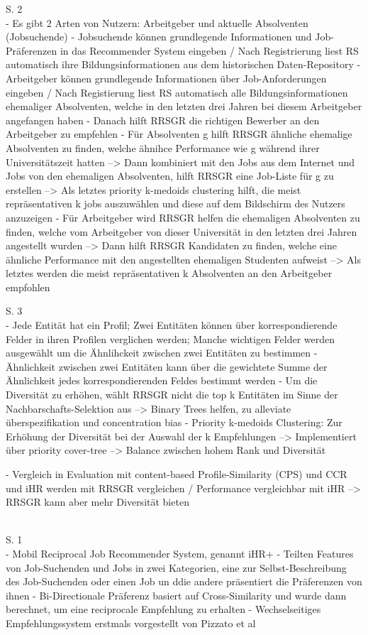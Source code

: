 S. 2\\
- Es gibt 2 Arten von Nutzern: Arbeitgeber und aktuelle Absolventen (Jobsuchende)
- Jobsuchende können grundlegende Informationen und Job-Präferenzen in das Recommender System eingeben / Nach Registrierung liest RS automatisch ihre Bildungsinformationen aus dem historischen Daten-Repository
- Arbeitgeber können grundlegende Informationen über Job-Anforderungen eingeben / Nach Registierung liest RS automatisch alle Bildungsinformationen ehemaliger Absolventen, welche in den letzten drei Jahren bei diesem Arbeitgeber angefangen haben
- Danach hilft RRSGR die richtigen Bewerber an den Arbeitgeber zu empfehlen
- Für Absolventen g hilft RRSGR ähnliche ehemalige Absolventen zu finden, welche ähnihce Performance wie g während ihrer Universitätszeit hatten --> Dann kombiniert mit den Jobs aus dem Internet und Jobs von den ehemaligen Absolventen, hilft RRSGR eine Job-Liste für g zu erstellen --> Als letztes priority k-medoids clustering hilft, die meist repräsentativen k jobs auszuwählen und diese auf dem Bildschirm des Nutzers anzuzeigen
- Für Arbeitgeber wird RRSGR helfen die ehemaligen Absolventen zu finden, welche vom Arbeitgeber von dieser Universität in den letzten drei Jahren angestellt wurden --> Dann hilft RRSGR Kandidaten zu finden, welche eine ähnliche Performance mit den angestellten ehemaligen Studenten aufweist --> Als letztes werden die meist repräsentativen k Absolventen an den Arbeitgeber empfohlen

S. 3\\
- Jede Entität hat ein Profil; Zwei Entitäten können über korrespondierende Felder in ihren Profilen verglichen werden; Manche wichtigen Felder werden ausgewählt um die Ähnlihckeit zwischen zwei Entitäten zu bestimmen
- Ähnlichkeit zwischen zwei Entitäten kann über die gewichtete Summe der Ähnlichkeit jedes korrespondierenden Feldes bestimmt werden
- Um die Diversität zu erhöhen, wählt RRSGR nicht die top k Entitäten im Sinne der Nachbarschafts-Selektion aus --> Binary Trees helfen, zu alleviate überspezifikation und concentration bias
- Priority k-medoids Clustering: Zur Erhöhung der Diversität bei der Auswahl der k Empfehlungen --> Implementiert über priority cover-tree --> Balance zwischen hohem Rank und Diversität

- Vergleich in Evaluation mit content-based Profile-Similarity (CPS) und CCR und iHR werden mit RRSGR vergleichen / Performance vergleichbar mit iHR --> RRSGR kann aber mehr Diversität bieten

\textcite{wenxing:2015}\\
S. 1\\
- Mobil Reciprocal Job Recommender System, genannt iHR+
- Teilten Features von Job-Suchenden und Jobs in zwei Kategorien, eine zur Selbst-Beschreibung des Job-Suchenden oder einen Job un ddie andere präsentiert die Präferenzen von ihnen
- Bi-Directionale Präferenz basiert auf Cross-Similarity und wurde dann berechnet, um eine reciprocale Empfehlung zu erhalten
- Wechselseitiges Empfehlungssystem erstmals vorgestellt von Pizzato et al

